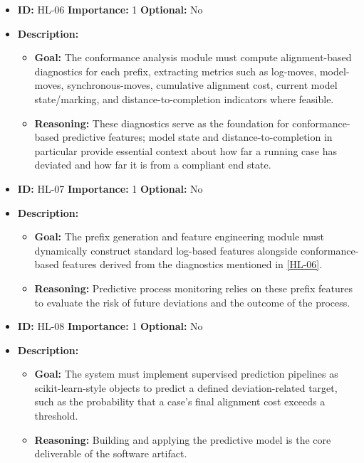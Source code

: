 \documentclass[12pt,a4paper]{article}
\begin{document}
\begin{itemize} \label{HL-06}
    \item \textbf{ID:} HL-06
 \textbf{Importance:} 1
 \textbf{Optional:} No
    \item \textbf{Description:}
    \begin{itemize}
        \item \textbf{Goal:} The conformance analysis module must compute alignment-based diagnostics for each prefix, extracting metrics such as log-moves, model-moves, synchronous-moves, cumulative alignment cost, current model state/marking, and distance-to-completion indicators where feasible.
        \item \textbf{Reasoning:} These diagnostics serve as the foundation for conformance-based predictive features; model state and distance-to-completion in particular provide essential context about how far a running case has deviated and how far it is from a compliant end state.
    \end{itemize}
\end{itemize}
\vspace{1.5em}

\begin{itemize}
    \item \textbf{ID:} HL-07
 \textbf{Importance:} 1
 \textbf{Optional:} No
    \item \textbf{Description:}
    \begin{itemize}
        \item \textbf{Goal:} The prefix generation and feature engineering module must dynamically construct standard log-based features alongside conformance-based features derived from the diagnostics mentioned in \ref{HL-06}.
        \item \textbf{Reasoning:} Predictive process monitoring relies on these prefix features to evaluate the risk of future deviations and the outcome of the process.
    \end{itemize}
\end{itemize}
\vspace{1.5em}

\begin{itemize}
    \item \textbf{ID:} HL-08
 \textbf{Importance:} 1
 \textbf{Optional:} No
    \item \textbf{Description:}
    \begin{itemize}
        \item \textbf{Goal:} The system must implement supervised prediction pipelines as scikit-learn-style objects to predict a defined deviation-related target, such as the probability that a case's final alignment cost exceeds a threshold.
        \item \textbf{Reasoning:} Building and applying the predictive model is the core deliverable of the software artifact.
    \end{itemize}
\end{itemize}
\vspace{1.5em}
\end{document}
